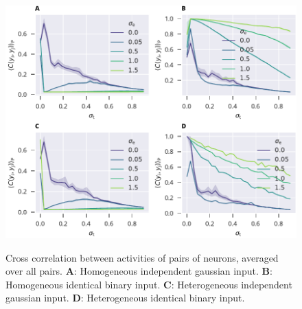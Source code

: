 \documentclass[12pt]{article}
\begin{document}
  \begin{figure}
    \includegraphics[width=5.78in]{./corr_act_composite.pdf}
    \label{fig:alt_hom_regulation}
    \caption{Cross correlation between activities of pairs of neurons, averaged over all pairs. {\bf A}: Homogeneous independent gaussian input. 
     {\bf B}: Homogeneous identical binary input. 
     {\bf C}: Heterogeneous independent gaussian input. 
     {\bf D}: Heterogeneous identical binary input.}
  \end{figure}
\end{document}
